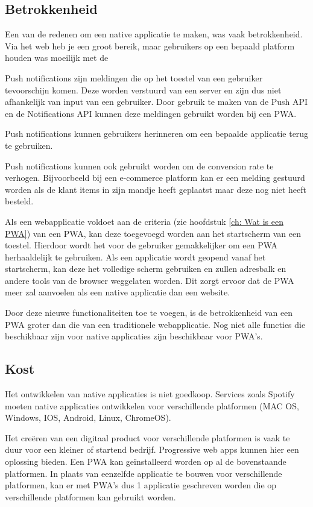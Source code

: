 	
\subsection{Betrokkenheid}
	Een van de redenen om een native applicatie te maken, was vaak betrokkenheid. Via het web heb je een groot bereik, maar gebruikers op een bepaald platform houden was moeilijk met de
	\autocite{Google2019}


	
	Push notifications zijn meldingen die op het toestel van een gebruiker tevoorschijn komen. Deze worden verstuurd van een server en zijn dus niet afhankelijk van input van een gebruiker. Door gebruik te maken van de Push API en de Notifications API kunnen deze meldingen gebruikt worden bij een PWA.
	
	Push notifications kunnen gebruikers herinneren om een bepaalde applicatie terug te gebruiken. 
	
	Push notifications kunnen ook gebruikt worden om de conversion rate te verhogen. Bijvoorbeeld bij een e-commerce platform kan er een melding gestuurd worden als de klant items in zijn mandje heeft geplaatst maar deze nog niet heeft besteld.
	\autocite{Gaunt2020}
	\autocite{Hiltunen2018}

	
	Als een webapplicatie voldoet aan de criteria (zie hoofdstuk \ref{ch: Wat is een PWA}) van een PWA, kan deze toegevoegd worden aan het startscherm van een toestel. Hierdoor wordt het voor de gebruiker gemakkelijker om een PWA herhaaldelijk te gebruiken. Als een applicatie wordt geopend vanaf het startscherm, kan deze het volledige scherm gebruiken en zullen adresbalk en andere tools van de browser weggelaten worden. Dit zorgt ervoor dat de PWA meer zal aanvoelen als een native applicatie dan een website.
	
	Door deze nieuwe functionaliteiten toe te voegen, is de betrokkenheid van een PWA groter dan die van een traditionele webapplicatie. Nog niet alle functies die beschikbaar zijn voor native applicaties zijn beschikbaar voor PWA's.
	

\subsection{Kost}
	Het ontwikkelen van native applicaties is niet goedkoop. Services zoals Spotify moeten native applicaties ontwikkelen voor verschillende platformen (MAC OS, Windows, IOS, Android, Linux, ChromeOS).
	
	Het creëren van een digitaal product voor verschillende platformen is vaak te duur voor een kleiner of startend bedrijf. Progressive web apps kunnen hier een oplossing bieden. Een PWA kan geïnstalleerd worden op al de bovenstaande platformen. In plaats van eenzelfde applicatie te bouwen voor verschillende platformen, kan er met PWA's dus 1 applicatie geschreven worden die op verschillende platformen kan gebruikt worden.
	

